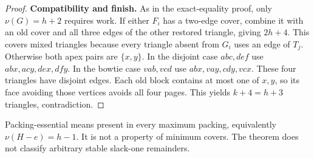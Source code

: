 \documentclass[11pt]{article}
\theoremstyle{definition}\newtheorem{definition}[theorem]{Definition}
\theoremstyle{remark}\newtheorem{remark}[theorem]{Remark}
\begin{document}
\begin{proof}
\textbf{Compatibility and finish.} As in the exact-equality proof, only \(\nu(G)=h+2\) requires work. If either \(F_i\) has a two-edge cover, combine it with an old cover and all three edges of the other restored triangle, giving \(2h+4\). This covers mixed triangles because every triangle absent from \(G_i\) uses an edge of \(T_j\). Otherwise both apex pairs are \(\{x,y\}\). In the disjoint case \(abc,def\) use \(abx,acy,dex,dfy\). In the bowtie case \(vab,vcd\) use \(abx,vay,cdy,vcx\). These four triangles have disjoint edges. Each old block contains at most one of \(x,y\), so its face avoiding those vertices avoids all four pages. This yields \(k+4=h+3\) triangles, contradiction.
\end{proof}
Packing-essential means present in every maximum packing, equivalently \(\nu(H-e)=h-1\). It is not a property of minimum covers. The theorem does not classify arbitrary stable slack-one remainders.
\end{document}
